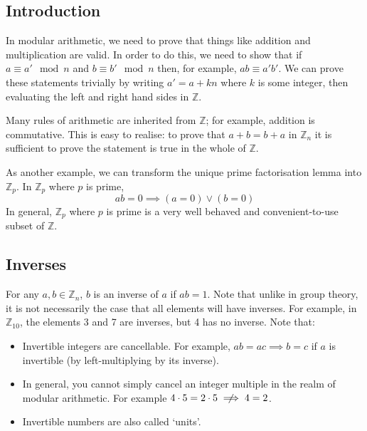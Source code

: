 \subsection{Introduction}
In modular arithmetic, we need to prove that things like addition and multiplication are valid.
In order to do this, we need to show that if \(a \equiv a' \mod n\) and \(b \equiv b' \mod n\) then, for example, \(ab \equiv a'b'\).
We can prove these statements trivially by writing \(a' = a + kn\) where \(k\) is some integer, then evaluating the left and right hand sides in \(\mathbb Z\).

Many rules of arithmetic are inherited from \(\mathbb Z\); for example, addition is commutative.
This is easy to realise: to prove that \(a + b = b + a\) in \(\mathbb Z_n\) it is sufficient to prove the statement is true in the whole of \(\mathbb Z\).

As another example, we can transform the unique prime factorisation lemma into \(\mathbb Z_p\).
In \(\mathbb Z_p\) where \(p\) is prime,
\[
	ab = 0 \implies (a = 0) \lor (b = 0)
\]
In general, \(\mathbb Z_p\) where \(p\) is prime is a very well behaved and convenient-to-use subset of \(\mathbb Z\).

\subsection{Inverses}
For any \(a, b \in \mathbb Z_n\), \(b\) is an inverse of \(a\) if \(ab=1\).
Note that unlike in group theory, it is not necessarily the case that all elements will have inverses.
For example, in \(\mathbb Z_{10}\), the elements 3 and 7 are inverses, but 4 has no inverse.
Note that:
\begin{itemize}
	\item Invertible integers are cancellable.
	      For example, \(ab=ac \implies b=c\) if \(a\) is invertible (by left-multiplying by its inverse).
	\item In general, you cannot simply cancel an integer multiple in the realm of modular arithmetic.
	      For example \(4 \cdot 5 = 2 \cdot 5 \centernot\implies 4 = 2\).
	\item Invertible numbers are also called `units'.
\end{itemize}

